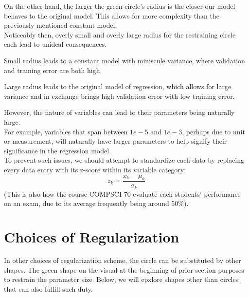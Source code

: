 On the other hand, the larger the green circle's radius is the closer our model behaves to the original model. This allows for more complexity than the previously mentioned constant model. \\
Noticeably then, overly small and overly large radius for the restraining circle each lead to unideal consequences.
\begin{bindenum}
    \item Small radius leads to a constant model with miniscule variance, where validation and training error are both high.
    \item Large radius leads to the original model of regression, which allows for large variance and in exchange brings high validation error with low training error.
\end{bindenum}


However, the nature of variables can lead to their parameters being naturally large. \\
For example, variables that span between $1e-5$ and $1e-3$, perhaps due to unit or measurement, will naturally have larger parameters to help signify their significance in the regression model. \\
To prevent such issues, we should attempt to standardize each data by replacing every data entry with its z-score within its variable category:
\[z_k = \frac{x_k - \mu_k}{\sigma_k}\]
(This is also how the course COMPSCI 70 evaluate each students' performance on an exam, due to its average frequently being around 50\%).

\section{Choices of Regularization}
In other choices of regularization scheme, the circle can be substituted by other shapes.
The green shape on the visual at the beginning of prior section purposes to restrain the parameter size. Below, we will epxlore shapes other than circles that can also fulfill such duty. \\

